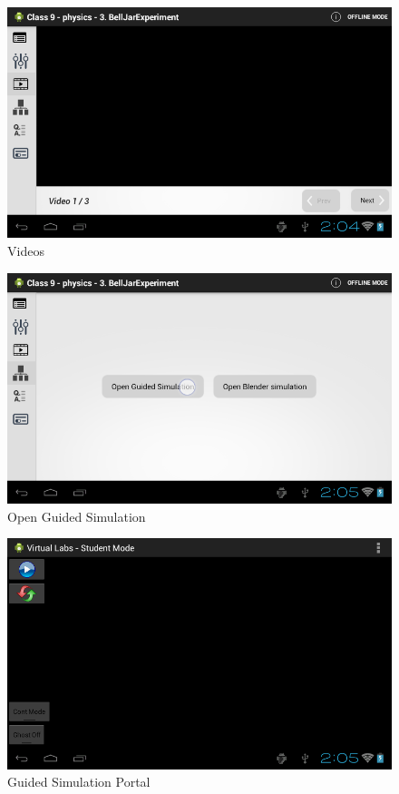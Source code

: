 \documentclass[12pt]{report}
\begin{document}
\begin{figure}[H]
 \centering
 \includegraphics[width=15cm]{./22.png}
 \caption{Videos \label{fig:22}}
\end{figure}



\begin{figure}[H]
 \centering
 \includegraphics[width=15cm]{./24.png}
 \caption{Open Guided Simulation \label{fig:24}}
\end{figure}

\begin{figure}[H]
 \centering
 \includegraphics[width=15cm]{./25.png}
 \caption{Guided Simulation Portal \label{fig:25}}
\end{figure}
\end{document}
